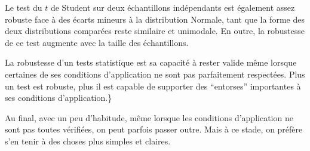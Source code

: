 \documentclass[
  a4paper,
  DIV=11,
  numbers=noendperiod,
  oneside]{scrreprt}
\begin{document}
Le test du \(t\) de Student sur deux échantillons indépendants est
également assez robuste face à des écarts mineurs à la distribution
Normale, tant que la forme des deux distributions comparées reste
similaire et unimodale. En outre, la robustesse de ce test augmente avec
la taille des échantillons.

\begin{tcolorbox}[enhanced jigsaw, breakable, toprule=.15mm, colbacktitle=quarto-callout-tip-color!10!white, colframe=quarto-callout-tip-color-frame, arc=.35mm, bottomtitle=1mm, opacityback=0, title=\textcolor{quarto-callout-tip-color}{\faLightbulb}\hspace{0.5em}{Robustesse}, bottomrule=.15mm, colback=white, toptitle=1mm, rightrule=.15mm, leftrule=.75mm, opacitybacktitle=0.6, left=2mm, titlerule=0mm, coltitle=black]

La robustesse d'un tests statistique est sa capacité à rester valide
même lorsque certaines de ses conditions d'application ne sont pas
parfaitement respectées. Plus un test est robuste, plus il est capable
de supporter des ``entorses'' importantes à ses conditions
d'application.\}

\end{tcolorbox}

Au final, avec un peu d'habitude, même lorsque les conditions
d'application ne sont pas toutes vérifiées, on peut parfois passer
outre. Mais à ce stade, on préfère s'en tenir à des choses plus simples
et claires.
\end{document}
